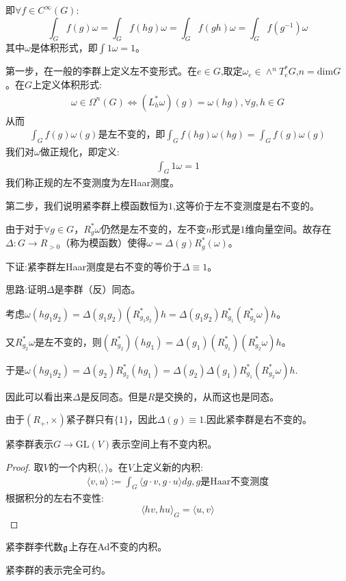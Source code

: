 即$\forall f \in C^{\infty}(G)$:
$$
\int_G f(g)\omega =\int_G f(hg)\omega= \int_G f(gh)\omega =\int_G f(g^{-1})\omega
$$
其中$\omega$是体积形式，即$\int 1\omega=1$。

第一步，在一般的李群上定义左不变形式。在$e \in G$,取定$\omega_e \in \wedge^n T_e^* G$,$n =\mathrm{dim}G$。在$G$上定义体积形式:
\begin{align*}
    \omega \in \Omega^n(G) \Leftrightarrow (L_h^*\omega)(g)=\omega(hg), \forall g,h \in G
\end{align*}
从而
\begin{align*}
    \int_G f(g)\omega(g)\text{是左不变的，即}\int_G f(hg)\omega(hg)=\int_G f(g)\omega(g)
\end{align*}
我们对$\omega$做正规化，即定义:
\begin{align*}
    \int_G 1\omega=1
\end{align*}
我们称正规的左不变测度为左Haar测度。

第二步，我们说明紧李群上模函数恒为$1$,这等价于左不变测度是右不变的。

由于对于$\forall g \in G$，$R_g^* \omega$仍然是左不变的，左不变$n$形式是$1$维向量空间。故存在$\Delta:G \to R_{>0}$（称为模函数）使得$\omega=\Delta(g)R_g^*(\omega)$。

下证:紧李群左Haar测度是右不变的等价于$\Delta \equiv 1$。

思路:证明$\Delta$是李群（反）同态。

考虑$\omega(hg_1g_2)=\Delta(g_1g_2)(R_{g_1g_2}^*)h=\Delta(g_1g_2)R_{g_1}^*(R_{g_2}^*\omega)h$。

又$R_{g_2}^*\omega$是左不变的，则$(R_{g_2}^*)(hg_1)=\Delta(g_1)(R_{g_1}^*)(R_{g_2}^*\omega)h$。

于是$\omega(hg_1g_2)=\Delta(g_2)R_{g_2}^*(hg_1)=\Delta(g_2)\Delta(g_1)R_{g_1}^*(R_{g_2}^*\omega)h$.

因此可以看出来$\Delta$是反同态。但是$R$是交换的，从而这也是同态。

由于$(R_{+},\times)$紧子群只有$\{1\}$，因此$\Delta(g)\equiv 1$.因此紧李群是右不变的。

\begin{theorem}
    紧李群表示$G \to \mathrm{GL}(V)$表示空间上有不变内积。
\end{theorem}
\begin{proof}
    取$V$的一个内积$\langle,\rangle$。在$V$上定义新的内积:\begin{align*}
        \langle v,u \rangle:=\int_G \langle g\cdot v,g\cdot u\rangle dg, g\text{是Haar不变测度}
    \end{align*}
    根据积分的左右不变性:
    $$
    \langle hv,hu\rangle_G =\langle u,v\rangle
    $$
\end{proof}
\begin{corollary}
    紧李群李代数$\mathfrak{g}$上存在Ad不变的内积。
\end{corollary}
\begin{theorem}
    紧李群的表示完全可约。
\end{theorem}
